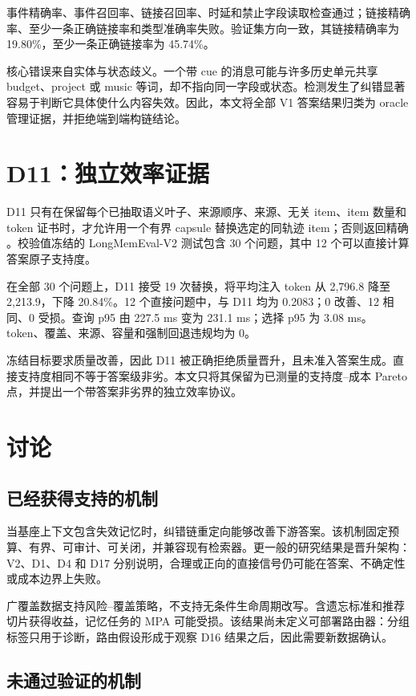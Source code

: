 事件精确率、事件召回率、链接召回率、时延和禁止字段读取检查通过；链接精确率、至少一条正确链接率和类型准确率失败。验证集方向一致，其链接精确率为 19.80\%，至少一条正确链接率为 45.74\%。

核心错误来自实体与状态歧义。一个带 cue 的消息可能与许多历史单元共享 budget、project 或 music 等词，却不指向同一字段或状态。检测发生了纠错显著容易于判断它具体使什么内容失效。因此，本文将全部 V1 答案结果归类为 oracle 管理证据，并拒绝端到端构链结论。

\section{D11：独立效率证据}
\label{sec:d11eff}

D11 只有在保留每个已抽取语义叶子、来源顺序、来源、无关 \base item、item 数量和 token 证书时，才允许用一个有界 capsule 替换选定的同轨迹 \base item；否则返回精确 \base。校验值冻结的 LongMemEval-V2 测试包含 30 个问题，其中 12 个可以直接计算答案原子支持度。

在全部 30 个问题上，D11 接受 19 次替换，将平均注入 token 从 2,796.8 降至 2,213.9，下降 20.84\%。12 个直接问题中，\base 与 D11 均为 0.2083；0 改善、12 相同、0 受损。查询 p95 由 227.5 ms 变为 231.1 ms；选择 p95 为 3.08 ms。token、覆盖、来源、容量和强制回退违规均为 0。

冻结目标要求质量改善，因此 D11 被正确拒绝质量晋升，且未准入答案生成。直接支持度相同不等于答案级非劣。本文只将其保留为已测量的支持度--成本 Pareto 点，并提出一个带答案非劣界的独立效率协议。

\section{讨论}

\subsection{已经获得支持的机制}

当基座上下文包含失效记忆时，纠错链重定向能够改善下游答案。该机制固定预算、有界、可审计、可关闭，并兼容现有检索器。更一般的研究结果是晋升架构：V2、D1、D4 和 D17 分别说明，合理或正向的直接信号仍可能在答案、不确定性或成本边界上失败。

广覆盖数据支持风险--覆盖策略，不支持无条件生命周期改写。含遗忘标准和推荐切片获得收益，记忆任务的 MPA 可能受损。该结果尚未定义可部署路由器：分组标签只用于诊断，路由假设形成于观察 D16 结果之后，因此需要新数据确认。

\subsection{未通过验证的机制}

